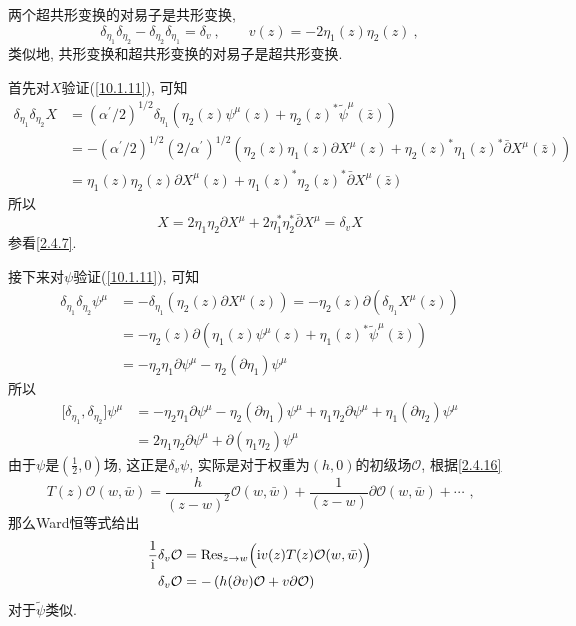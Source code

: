 两个超共形变换的对易子是共形变换,
\begin{equation}
    \delta_{\eta_{1}}\delta_{\eta_{2}}-\delta_{\eta_{2}}\delta_{\eta_{1}}=\delta_{v}\:,\qquad
    v(z)= -2\eta_{1}(z)\eta_{2}(z) \:, \label{10.1.11}
\end{equation}
类似地, 共形变换和超共形变换的对易子是超共形变换.
\begin{tcolorbox}[breakable]
首先对$ X $验证(\ref{10.1.11}), 可知
\begin{align*}
    \delta_{\eta_{1}}\delta_{\eta_{2}}X &=  (\alpha^{\prime}/2)^{1/2}
    \delta_{\eta_{1}}(\eta_{2}(z)\psi^{\mu}(z) + \eta_{2}(z)^{\ast} \tilde{\psi}^{\mu}(\bar{z})) \\
    &=-(\alpha^{\prime}/2)^{1/2} (2/\alpha^{\prime})^{1/2}
    (\eta_{2}(z)\eta_{1}(z)\partial X^{\mu}(z) + \eta_{2}(z)^{\ast} \eta_{1}(z)^{\ast}\bar{\partial}X^{\mu}(\bar{z}))  \\
    &=
    \eta_{1}(z)\eta_{2}(z)\partial X^{\mu}(z) +
    \eta_{1}(z)^{\ast} \eta_{2}(z)^{\ast}\bar{\partial}X^{\mu}(\bar{z})
\end{align*}
所以
\begin{equation*}
    [\delta_{\eta_{1}},\delta_{\eta_{2}}]X= 
     2\eta_{1}\eta_{2}\partial X^{\mu} + 2\eta_{1}^{\ast} \eta_{2}^{\ast}\bar{\partial}X^{\mu}
     =\delta_{v}X
\end{equation*}
参看\eqref{2.4.7}.

接下来对$ \psi $验证(\ref{10.1.11}),
可知\begin{align*}
\delta _{\eta _{1}}\delta _{\eta _{2}}\psi ^{\mu } &=-\delta _{\eta
_{1}}\left( \eta _{2}(z)\partial X^{\mu }(z)\right) =-\eta _{2}(z)\partial
(\delta _{\eta _{1}}X^{\mu }(z)) \\
&=-\eta _{2}(z)\partial (\eta _{1}(z)\psi ^{\mu }(z)+\eta _{1}(z)^{\ast }%
\tilde{\psi}^{\mu }(\bar{z})) \\
&=-\eta _{2}\eta _{1}\partial \psi ^{\mu }-\eta _{2}(\partial \eta
_{1})\psi ^{\mu }
\end{align*}%
所以\begin{align*}
\lbrack \delta _{\eta _{1}},\delta _{\eta _{2}}]\psi ^{\mu } &=-\eta
_{2}\eta _{1}\partial \psi ^{\mu }-\eta _{2}(\partial \eta _{1})\psi ^{\mu
}+\eta _{1}\eta _{2}\partial \psi ^{\mu }+\eta _{1}(\partial \eta _{2})\psi
^{\mu } \\
&=2\eta _{1}\eta _{2}\partial \psi ^{\mu }+\partial (\eta _{1}\eta
_{2})\psi ^{\mu }
\end{align*}%
由于$\psi $是$(\frac{1}{2},0)$场, 这正是$\delta _{v}\psi $, 实际是对于权重为$(h,0)$的初级场$\mathcal{O}$, 根据\eqref{2.4.16}%
\[
T(z)\mathcal{O}(w,\bar{w})=\frac{h}{(z-w)^{2}}\mathcal{O}(w,\bar{w})+\frac{1}{(z-w)}\partial \mathcal{O}(w,%
\bar{w})+\cdots \text{ ,}
\]%
那么Ward恒等式给出\begin{align*}
\frac{1}{\mi }\delta _{v}\mathcal{O} &=\operatorname{Res}_{z\to w}\Bigl(\mi v(z)T(z)\mathcal{O}(w,%
\bar{w})\Bigr) \\
\delta _{v}\mathcal{O} &=-\left( h(\partial v)\mathcal{O}+v\partial \mathcal{O}\right)
\end{align*}
对于$ \tilde{\psi} $类似.


\end{tcolorbox}

